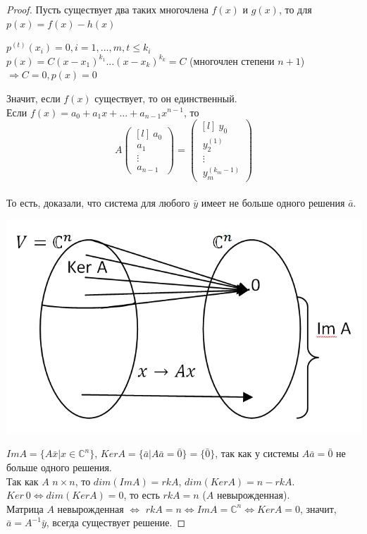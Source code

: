 \documentclass[12pt]{article}
\begin{document}
	\begin{proof}
	Пусть существует два таких многочлена $f(x)$ и $g(x)$, то для $p(x) = f(x)-h(x)$
	\begin{center}
		$p^{(t)}(x_i) = 0, i=1,...,m, t\leq k_i$\\
		$p(x) = C(x-x_1)^{k_1}...(x-x_k)^{k_k} = C$ (многочлен степени $n+1$)\\
		$\Rightarrow C = 0, p(x) = 0$
	\end{center}
	Значит, если $f(x)$ существует, то он единственный.\\
	Если $f(x) = a_0+a_1x+...+a_{n-1}x^{n-1}$, то \\
	\[A \begin{pmatrix}[l]
	~a_0 \\
	~a_1 \\
	~\vdots\\
	~a_{n-1}
	\end{pmatrix} = \begin{pmatrix}[l]
	~y_0 \\
	~y_2^{(1)}\\
	~\vdots\\
	~y_m^{(k_m-1)}
	\end{pmatrix}\]\\
	То есть, доказали, что система для любого $\bar y$ имеет не больше одного решения $\bar a$.\begin{center}
		\includegraphics[scale=0.4]{l3_2.png}\end{center}
	$Im A = \{ A \bar x | x\in \mathbb{C}^n \} $, 
	$Ker A = \{\bar a | A \bar a = \bar 0 \} = \{\bar 0 \} $, так как у системы $A \bar a = \bar 0$ не больше одного решения.\\
	Так как $A$ $n \times n$, то 
	$dim(Im A) = rk A$, $dim(Ker A) = n-rk A$.\\ 
	$Ker~ 0 \Leftrightarrow dim(Ker A) = 0$, то есть $rk A = n$ ($A$ невырожденная). \\
	Матрица $A$ невырожденная $\Leftrightarrow$ $rk A = n \Leftrightarrow Im A = \mathbb{C}^n \Leftrightarrow Ker A = 0$, значит, $\bar a = A^{-1}\bar y$, всегда существует решение. 
	\end{proof}
\end{document}
